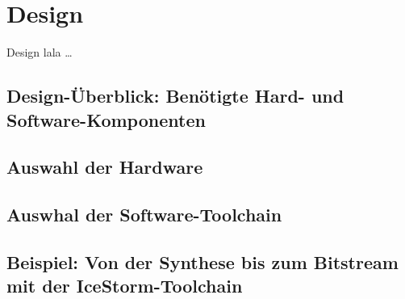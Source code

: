 \chapter{Design}
\label{ch:Design}
Design lala \ldots


\section{Design-\"Uberblick: Ben\"otigte Hard- und Software-Komponenten}
\section{Auswahl der Hardware}
\section{Auswhal der Software-Toolchain}
\section{Beispiel: Von der Synthese bis zum Bitstream mit der IceStorm-Toolchain}


